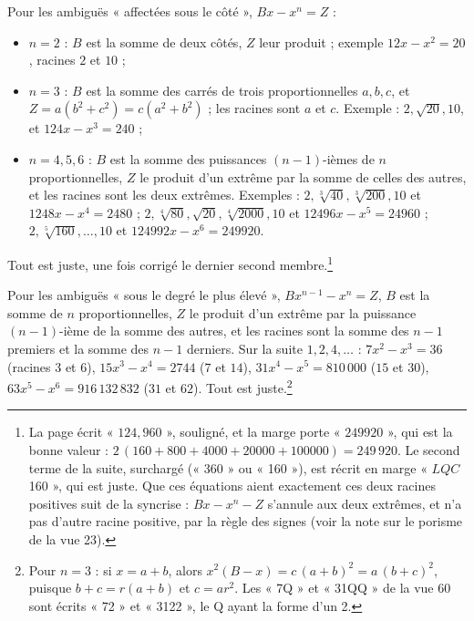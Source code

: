 \documentclass[11pt,a4paper]{article}
\begin{document}
Pour les ambiguës « affectées sous le côté », $Bx - x^n = Z$ :
\begin{itemize}
  \item $n = 2$ : $B$ est la somme de deux côtés, $Z$ leur produit ; exemple
    $12x - x^2 = 20$, racines $2$ et $10$ ;
  \item $n = 3$ : $B$ est la somme des carrés de trois proportionnelles
    $a, b, c$, et $Z = a(b^2 + c^2) = c(a^2 + b^2)$ ; les racines sont $a$ et $c$.
    Exemple : $2, \sqrt{20}, 10$, et $124x - x^3 = 240$ ;
  \item $n = 4, 5, 6$ : $B$ est la somme des puissances $(n-1)$-ièmes de $n$
    proportionnelles, $Z$ le produit d'un extrême par la somme de celles des
    autres, et les racines sont les deux extrêmes. Exemples :
    $2, \sqrt[3]{40}, \sqrt[3]{200}, 10$ et $1248x - x^4 = 2480$ ;
    $2, \sqrt[4]{80}, \sqrt{20}, \sqrt[4]{2000}, 10$ et
    $12496x - x^5 = 24960$ ; $2, \sqrt[5]{160}, \ldots, 10$ et
    $124992x - x^6 = 249920$.
\end{itemize}
Tout est juste, une fois corrigé le dernier second membre.\footnote{La page écrit
« $124{,}960$ », souligné, et la marge porte « $249920$ », qui est la bonne valeur :
$2\,(160 + 800 + 4000 + 20000 + 100000) = 249\,920$. Le second terme de la suite,
surchargé (« 360 » ou « 160 »), est récrit en marge « $LQC$ 160 », qui est juste.
Que ces équations aient exactement ces deux racines positives suit de la
syncrise : $Bx - x^n - Z$ s'annule aux deux extrêmes, et n'a pas d'autre racine
positive, par la règle des signes (voir la note sur le porisme de la vue 23).}

Pour les ambiguës « sous le degré le plus élevé », $Bx^{n-1} - x^n = Z$, $B$ est la
somme de $n$ proportionnelles, $Z$ le produit d'un extrême par la puissance
$(n-1)$-ième de la somme des autres, et les racines sont la somme des $n - 1$
premiers et la somme des $n - 1$ derniers. Sur la suite $1, 2, 4, \ldots$ :
$7x^2 - x^3 = 36$ (racines $3$ et $6$), $15x^3 - x^4 = 2744$ ($7$ et $14$),
$31x^4 - x^5 = 810\,000$ ($15$ et $30$), $63x^5 - x^6 = 916\,132\,832$ ($31$ et
$62$). Tout est juste.\footnote{Pour $n = 3$ : si $x = a + b$, alors
$x^2(B - x) = c\,(a + b)^2 = a\,(b + c)^2$, puisque $b + c = r(a + b)$ et $c = ar^2$.
Les « 7Q » et « 31QQ » de la vue 60 sont écrits « 72 » et « 3122 », le Q ayant la
forme d'un 2.}
\end{document}
